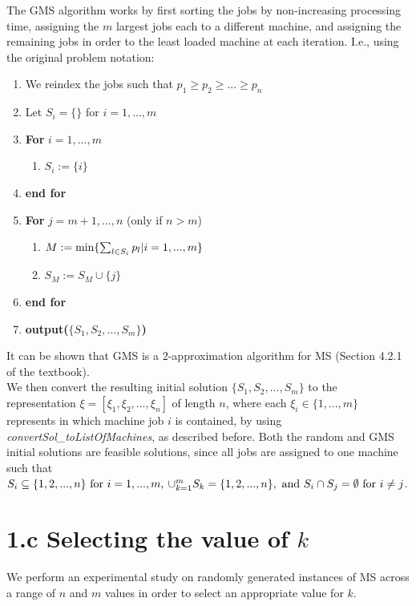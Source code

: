 \documentclass[12pt,a4paper,reqno]{article}
\begin{document}
The GMS algorithm works by first sorting the jobs by non-increasing processing time, assigning the $m$ largest jobs each to a different machine, and assigning the remaining jobs in order to the least loaded machine at each iteration. I.e., using the original problem notation:

\begin{enumerate}
\item We reindex the jobs such that $p_1 \geq p_2 \geq ... \geq p_n$
\item Let $S_i = \{ \}$ for $i=1,...,m$
\item \textbf{For} $i=1,...,m$
\begin{enumerate}
\item $S_i := \{i \}$
\end{enumerate}
\item[] \textbf{end for}
\item \textbf{For} $j=m+1,...,n$ (only if $n > m$)
\begin{enumerate}
\item $M := \textnormal{min} \{ \sum_{l \in S_i} p_l | i = 1,...,m \}$
\item $S_M := S_M \cup \{ j \}$
\end{enumerate}
\item[] \textbf{end for}
\item \textbf{output($\{S_1,S_2,...,S_m\}$)}
\end{enumerate}

It can be shown that GMS is a $2$-approximation algorithm for MS (Section 4.2.1 of the textbook). \\

We then convert the resulting initial solution $\{S_1,S_2,...,S_m\}$ to the representation $\xi = [\xi_1,\xi_2,...,\xi_n]$ of length $n$, where each $\xi_i \in \{1,...,m\}$ represents in which machine job $i$ is contained, by using \textit{convertSol\_toListOfMachines}, as described before. Both the random and GMS initial solutions are feasible solutions, since all jobs are assigned to one machine such that $S_i \subseteq \{1,2,...,n\} \textnormal{ for } i=1,...,m, \> \cup_{k=1}^m S_k = \{1,2,...,n\}, \textnormal{ and } S_i \cap S_j = \emptyset \textnormal{ for } i \neq j$.

\section*{1.c Selecting the value of $k$} \label{sec:selectingk}
We perform an experimental study on randomly generated instances of MS across a range of $n$ and $m$ values in order to select an appropriate value for $k$. \\
\end{document}
